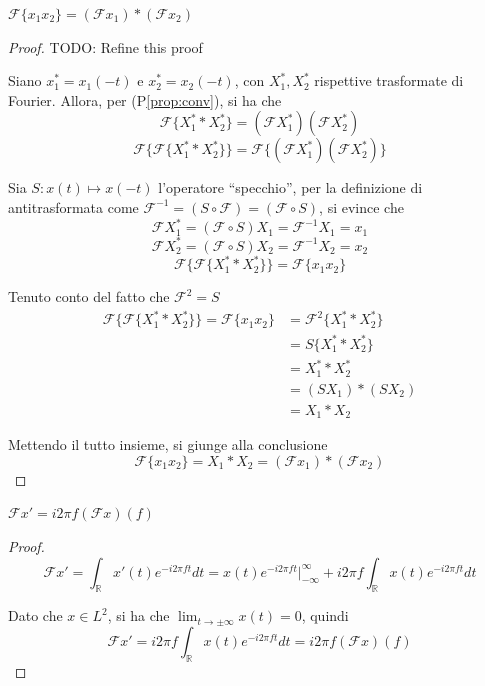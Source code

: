         \begin{property}
            $\mathcal{F}\{x_1 x_2\} = (\mathcal{F}x_1) * (\mathcal{F}x_2)$
        \end{property}
        \begin{proof}
            TODO: Refine this proof

            Siano $x_1^* = x_1(-t)$ e $x_2^* = x_2(-t)$, con $X_1^*, X_2^*$ rispettive trasformate di Fourier.
            Allora, per (P\ref{prop:conv}), si ha che
            \[
                \mathcal{F}\{X_1^* * X_2^*\} = (\mathcal{F}X_1^*)(\mathcal{F}X_2^*)
            \]
            \[
                \mathcal{F}\{\mathcal{F}\{X_1^* * X_2^*\}\} = \mathcal{F}\{(\mathcal{F}X_1^*)(\mathcal{F}X_2^*)\}
            \]

            Sia $S: x(t) \mapsto x(-t)$ l'operatore ``specchio'', per la definizione di antitrasformata come $\mathcal{F}^{-1} = (S \circ \mathcal{F}) = (\mathcal{F} \circ S)$, si evince che
            \[
                \mathcal{F} X_1^* = (\mathcal{F} \circ S) X_1 = \mathcal{F}^{-1} X_1 = x_1
            \]
            \[
                \mathcal{F} X_2^* = (\mathcal{F} \circ S) X_2 = \mathcal{F}^{-1} X_2 = x_2
            \]
            \[
                \mathcal{F}\{\mathcal{F}\{X_1^* * X_2^*\}\} = \mathcal{F}\{x_1 x_2\}
            \]

            Tenuto conto del fatto che $\mathcal{F}^2 = S$
            \begin{align*}
                \mathcal{F}\{\mathcal{F}\{X_1^* * X_2^*\}\} = \mathcal{F}\{x_1 x_2\} &= \mathcal{F}^2 \{X_1^* * X_2^*\} \\
                &= S \{X_1^* * X_2^*\} \\
                &= X_1^* * X_2^* \\
                &= (S X_1) * (S X_2) \\
                &= X_1 * X_2
            \end{align*}

            Mettendo il tutto insieme, si giunge alla conclusione 
            \[
                \mathcal{F}\{x_1x_2\} = X_1 * X_2 = (\mathcal{F} x_1) * (\mathcal{F} x_2)
            \]
        \end{proof}

        \begin{property}
            $\mathcal{F}x' = i 2 \pi f (\mathcal{F} x)(f)$
        \end{property}
        \begin{proof}
            \[
                \mathcal{F}x' = 
                \int_{\mathbb{R}} x'(t) e^{-i 2 \pi f t} dt = 
                x(t) e^{-i 2 \pi f t} |_{-\infty}^{\infty} + i 2 \pi f \int_{\mathbb{R}} x(t) e^{-i 2 \pi f t} dt
            \]

            Dato che $x \in L^2$, si ha che $\lim_{t \rightarrow \pm \infty} x(t) = 0$, quindi
            \[
                \mathcal{F}x' = 
                i 2 \pi f \int_{\mathbb{R}} x(t) e^{-i 2 \pi f t} dt = 
                i 2 \pi f (\mathcal{F}x)(f)
            \]
        \end{proof}

